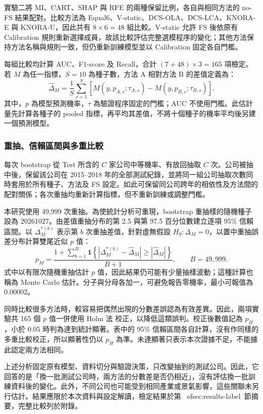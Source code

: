 實驗二將 MI、CART、SHAP 與 RFE 的兩種保留比例，各自與相同方法的 no-FS 結果配對。比較方法為 Equal6、V-static、DCS-OLA、DCS-LCA、KNORA-E 與 KNORA-U，因此共有 \(8\times6=48\) 組比較。V-static 允許 FS 後依原有 Calibration 規則重新選擇成員，故該比較評估完整選模程序的變化；其他方法保持方法名稱與規則一致，但仍重新訓練模型並以 Calibration 固定各自門檻。

每組比較均計算 AUC、F1-score 及 Recall，合計 \((7+48)\times3=165\) 項檢定。若 \(M\) 為任一指標，\(S=10\) 為種子數，方法 A 相對方法 B 的差值定義為：
\begin{equation}\label{eq:stats-difference}
\widehat{\Delta}_M=\frac{1}{S}\sum_{s=1}^{S}
\left[M(y,p_{A,s};\tau_{A,s})-M(y,p_{B,s};\tau_{B,s})\right].
\end{equation}
其中，\(p\) 為模型預測機率，\(\tau\) 為驗證程序固定的門檻；AUC 不使用門檻。此估計量先計算各種子的 pooled 指標，再平均其差值，不將十個種子的機率平均後另建一個預測模型。

\subsubsection{重抽、信賴區間與多重比較}

每次 bootstrap 從 Test 所含的 \(C\) 家公司中等機率、有放回抽取 \(C\) 次。公司被抽中後，保留該公司在 2015--2018 年的全部測試紀錄，並將同一組公司抽取次數同時套用於所有種子、方法及 FS 設定。如此可保留同公司跨年的相依性及方法間的配對關係；各次重抽均重新計算指標，但不重新訓練或調整門檻。

本研究使用 49,999 次重抽。為使統計分析可重現，bootstrap 重抽樣的隨機種子設為 20261027。由差值重抽分布的第 2.5 與第 97.5 百分位數建立逐項 95\% 信賴區間。以 \(\Delta_M^{*(b)}\) 表示第 \(b\) 次重抽差值，針對虛無假設 \(H_0:\Delta_M=0\)，以置中重抽誤差分布計算雙尾近似 \(p\) 值：
\begin{equation}\label{eq:stats-bootstrap-p}
p_M=\frac{1+\sum_{b=1}^{B}\mathbf{1}\!\left\{
\left|\Delta_M^{*(b)}-\widehat{\Delta}_M\right|\geq
\left|\widehat{\Delta}_M\right|\right\}}{B+1},
\qquad B=49{,}999.
\end{equation}
式中以有限次隨機重抽估計 \(p\) 值，因此結果仍可能有少量抽樣波動；這種計算也稱為 Monte Carlo 估計。分子與分母各加一，可避免報告零機率，最小可報值為 0.00002。

同時比較很多方法時，較容易把偶然出現的分數差誤認為有效差異。因此，兩項實驗共 165 個 \(p\) 值一併使用 Holm 法\autocite{holm1979multiple} 校正，以降低這類誤判。校正後數值記為 \(p_H\)，小於 0.05 時判為達到統計顯著。表中的 95\% 信賴區間各自計算，沒有作同樣的多重比較校正，所以顯著性仍以 \(p_H\) 為準。未達顯著只表示本次證據不足，不能據此認定兩方法相同。

上述分析固定原有模型、資料切分與驗證決策，只改變抽到的測試公司。因此，它回答的是「換一批測試公司時，兩方法的分數差是否仍相近」，沒有評估換一批訓練資料後的變化。此外，不同公司也可能受到相同產業或景氣影響，這些關聯未另行估計。結果應限於本次資料與設定解讀，檢定結果於第~
ef{sec:results-label}~節摘要，完整比較列於附錄。
\endgroup
